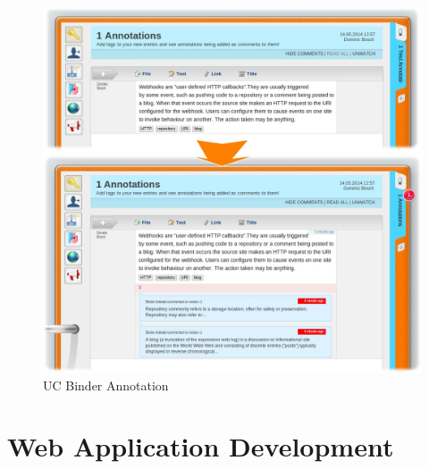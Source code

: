 \begin{figure}[!ht]
	\centering
  \includegraphics[width=\textwidth]{figures/UC_Binder_Annotations}
	\caption{UC Binder Annotation}
	\label{fig:UC_Binder_Annotations}
\end{figure}

\section{Web Application Development}




